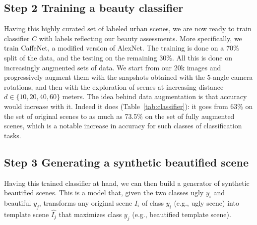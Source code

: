 \subsection*{Step 2 Training a beauty classifier}
Having this highly curated set of labeled urban scenes, we are now ready to train classifier $C$ with labels reflecting our beauty assessments. More specifically, we train CaffeNet, a modified version of AlexNet\cite{krizhevsky2012imagenet,szegedy2015going}. The training is done on a 70\% split of the data, and the testing on the remaining 30\%. All this is done on increasingly augmented sets of data. We start from our 20k images and progressively augment them with  the snapshots obtained with the 5-angle camera rotations, and then with the exploration of scenes at increasing distance $d \in \{10,20,40,60\}$ meters. The idea behind data augmentation is that accuracy would increase with it. Indeed it does (Table~\ref{tab:classifier}): it goes from 63\% on the set of original scenes to as much as 73.5\% on the set of fully augmented scenes, which is a notable increase in accuracy for such classes of classification tasks. 




\subsection*{Step 3 Generating a synthetic beautified scene}
Having this trained classifier at hand, we can then build a generator of synthetic beautified scenes. This is a model that, given the two classes ugly $y_i$ and beautiful $y_j$, transforms any original scene $I_i$ of class $y_i$ (e.g., ugly scene) into template scene $\hat{I_j}$ that maximizes class $y_j$ (e.g., beautified template scene). 


